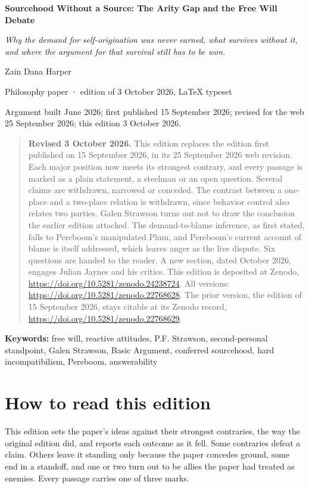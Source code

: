 \documentclass[11pt]{article}
\begin{document}
\begin{center}
{\LARGE\bfseries Sourcehood Without a Source: The Arity Gap and the Free Will Debate\par}
\medskip
{\large\emph{Why the demand for self-origination was never earned, what survives without it, and where the argument for that survival still has to be won.}\par}
\medskip
Zain Dana Harper\par
{\small Philosophy paper · edition of 3 October 2026, LaTeX typeset\par}
{\small Argument built June 2026; first published 15 September 2026; revised for the web 25 September 2026; this edition 3 October 2026.\par}
\end{center}

\begin{quote}\small
\textbf{Revised 3 October 2026.} This edition replaces the edition first published on 15 September 2026, in its 25 September 2026 web revision. Each major position now meets its strongest contrary, and every passage is marked as a plain statement, a steelman or an open question. Several claims are withdrawn, narrowed or conceded. The contrast between a one-place and a two-place relation is withdrawn, since behavior control also relates two parties. Galen Strawson turns out not to draw the conclusion the earlier edition attacked. The demand-to-blame inference, as first stated, falls to Pereboom's manipulated Plum, and Pereboom's current account of blame is itself addressed, which leaves anger as the live dispute. Six questions are handed to the reader. A new section, dated October 2026, engages Julian Jaynes and his critics. This edition is deposited at Zenodo, \url{https://doi.org/10.5281/zenodo.24238724}. All versions: \url{https://doi.org/10.5281/zenodo.22768628}. The prior version, the edition of 15 September 2026, stays citable at its Zenodo record, \url{https://doi.org/10.5281/zenodo.22768629}.
\end{quote}
\textbf{Keywords:} free will, reactive attitudes, P.F. Strawson, second-personal standpoint, Galen Strawson, Basic Argument, conferred sourcehood, hard incompatibilism, Pereboom, answerability

\section*{How to read this edition}

This edition sets the paper's ideas against their strongest contraries, the way the original edition did, and reports each outcome as it fell. Some contraries defeat a claim. Others leave it standing only because the paper concedes ground, some end in a standoff, and one or two turn out to be allies the paper had treated as enemies. Every passage carries one of three marks.
\end{document}
